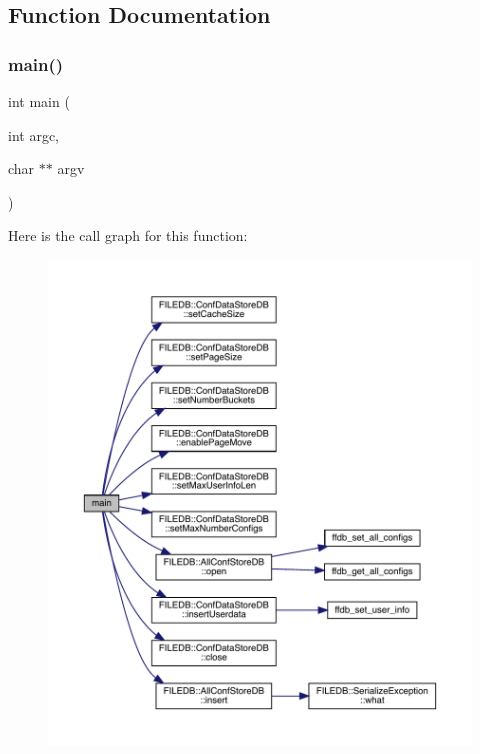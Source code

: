 \subsection{Function Documentation}
\mbox{\label{adat-devel_2other__libs_2filedb_2src_2AllConfCreateTest_8cpp_a3c04138a5bfe5d72780bb7e82a18e627}} 
\subsubsection{\texorpdfstring{main()}{main()}}
{\footnotesize\ttfamily int main (\begin{DoxyParamCaption}\item[{int}]{argc,  }\item[{char $\ast$$\ast$}]{argv }\end{DoxyParamCaption})}

Here is the call graph for this function\+:
\nopagebreak
\begin{figure}[H]
\begin{center}
\leavevmode
\includegraphics[width=350pt]{d7/d78/adat-devel_2other__libs_2filedb_2src_2AllConfCreateTest_8cpp_a3c04138a5bfe5d72780bb7e82a18e627_cgraph}
\end{center}
\end{figure}
